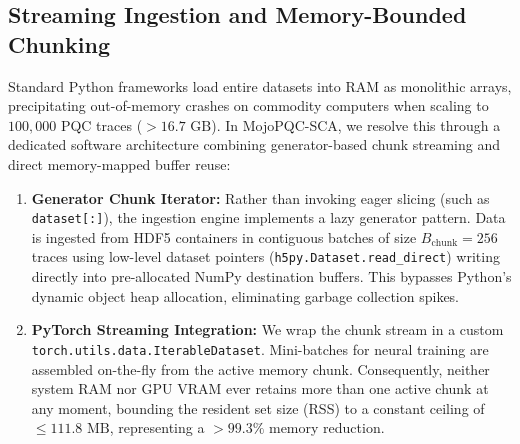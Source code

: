 \documentclass[letterpaper]{article}
\begin{document}
\subsection{Streaming Ingestion and Memory-Bounded Chunking}
Standard Python frameworks load entire datasets into RAM as monolithic arrays, precipitating out-of-memory crashes on commodity computers when scaling to $100,000$ PQC traces ($>16.7\text{ GB}$). In MojoPQC-SCA, we resolve this through a dedicated software architecture combining generator-based chunk streaming and direct memory-mapped buffer reuse:
\begin{enumerate}
    \item \textbf{Generator Chunk Iterator:} Rather than invoking eager slicing (such as \texttt{dataset[:]}), the ingestion engine implements a lazy generator pattern. Data is ingested from HDF5 containers in contiguous batches of size $B_{\text{chunk}} = 256$ traces using low-level dataset pointers (\texttt{h5py.Dataset.read\_direct}) writing directly into pre-allocated NumPy destination buffers. This bypasses Python's dynamic object heap allocation, eliminating garbage collection spikes.
    \item \textbf{PyTorch Streaming Integration:} We wrap the chunk stream in a custom \texttt{torch.utils.data.IterableDataset}. Mini-batches for neural training are assembled on-the-fly from the active memory chunk. Consequently, neither system RAM nor GPU VRAM ever retains more than one active chunk at any moment, bounding the resident set size (RSS) to a constant ceiling of $\le 111.8\text{ MB}$, representing a $>99.3\%$ memory reduction.
\end{enumerate}
\end{document}
